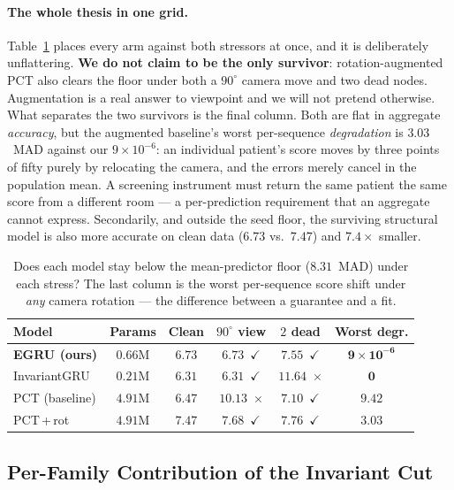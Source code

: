 \documentclass[10pt,journal]{IEEEtran}
\begin{document}
\paragraph{The whole thesis in one grid.} Table~\ref{tab:pareto} places every arm against both
stressors at once, and it is deliberately unflattering. \textbf{We do not claim to be the only
survivor}: rotation-augmented PCT also clears the floor under both a $90^\circ$ camera move and two
dead nodes. Augmentation is a real answer to viewpoint and we will not pretend otherwise. What
separates the two survivors is the final column. Both are flat in aggregate \emph{accuracy}, but the
augmented baseline's worst per-sequence \emph{degradation} is $3.03$~MAD against our
$9\times10^{-6}$: an individual patient's score moves by three points of fifty purely by relocating
the camera, and the errors merely cancel in the population mean. A screening instrument must return
the same patient the same score from a different room --- a per-prediction requirement that an
aggregate cannot express. Secondarily, and outside the seed floor, the surviving structural model is
also more accurate on clean data ($6.73$ vs.\ $7.47$) and $7.4\times$ smaller.

\begin{table}[!t]
\centering
\caption{Does each model stay below the mean-predictor floor ($8.31$~MAD) under each stress? The last
column is the worst per-sequence score shift under \emph{any} camera rotation --- the difference
between a guarantee and a fit.}
\label{tab:pareto}
\scriptsize
\setlength{\tabcolsep}{4pt}
\begin{tabular}{lccccc}
\toprule
Model & Params & Clean & $90^\circ$ view & $2$ dead & Worst degr. \\
\midrule
\textbf{EGRU (ours)} & $0.66$M & $6.73$ & $6.73$~$\checkmark$ & $7.55$~$\checkmark$ & $\mathbf{9\!\times\!10^{-6}}$ \\
InvariantGRU   & $0.21$M & $6.31$ & $6.31$~$\checkmark$ & $11.64$~$\times$ & $\mathbf{0}$ \\
PCT (baseline) & $4.91$M & $6.47$ & $10.13$~$\times$ & $7.10$~$\checkmark$ & $9.42$ \\
PCT\,+\,rot    & $4.91$M & $7.47$ & $7.68$~$\checkmark$ & $7.76$~$\checkmark$ & $3.03$ \\
\bottomrule
\end{tabular}
\end{table}

\subsection{Per-Family Contribution of the Invariant Cut}
\label{sec:results:ablation}
\end{document}
